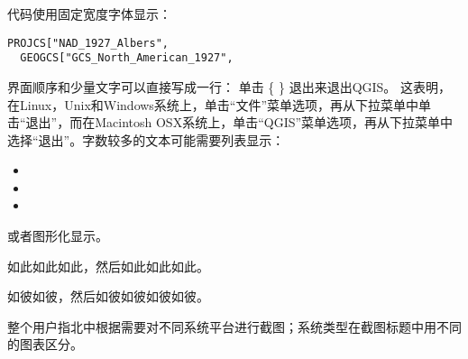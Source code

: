 代码使用固定宽度字体显示：
\begin{verbatim}
PROJCS["NAD_1927_Albers",
  GEOGCS["GCS_North_American_1927",
\end{verbatim}


界面顺序和少量文字可以直接写成一行： 单击 \{\nix{} \} \arrow 退出来退出QGIS。
这表明，在Linux，Unix和Windows系统上，单击“文件”菜单选项，再从下拉菜单中单击“退出”，而在Macintosh OSX系统上，单击“QGIS”菜单选项，再从下拉菜单中选择“退出”。字数较多的文本可能需要列表显示：

\begin{itemize}
\item {}
\item {}
\item {}
\end{itemize}

或者图形化显示。

\nix{} \osx{} 如此如此如此，然后如此如此如此。

\win{} 如彼如彼，然后如彼如彼如彼如彼。

整个用户指北中根据需要对不同系统平台进行截图；系统类型在截图标题中用不同的图表区分。